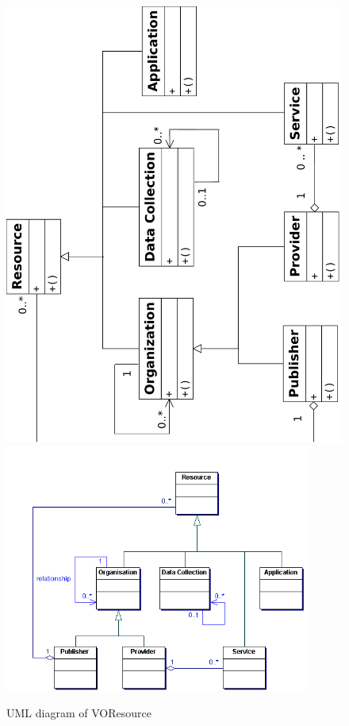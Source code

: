     \begin{figure}[!htbp]
      \begin{center}
        \leavevmode
        \ifpdf
        \includegraphics[height=0.9\textwidth, angle=-90]{resources}
        \else
        \includegraphics[width=0.9\textwidth]{resource.png}
        \fi
      \end{center}
        \caption{UML diagram of VOResource}
        \label{FigResource}
    \end{figure}

\clearpage

